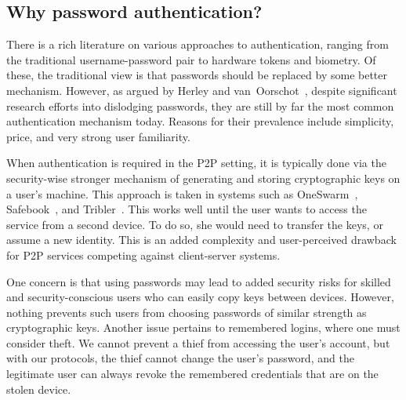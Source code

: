 
\subsection{Why password authentication?}

There is a rich literature on various approaches to authentication, ranging
from the traditional username-password pair to hardware tokens and
biometry. Of these, the traditional view is that passwords should be replaced
by some better mechanism. However, as argued by Herley and
van~Oorschot~\cite{HerleyO12}, despite significant research efforts into
dislodging passwords, they are still by far the most common authentication
mechanism today. Reasons for their prevalence include simplicity, price, and
very strong user familiarity.

When authentication is required in the P2P setting, it is typically done
via the security-wise stronger mechanism of generating and storing
cryptographic keys on a user's machine. This approach is taken in systems such
as OneSwarm~\cite{IsdalPKA10}, Safebook~\cite{Cutillo09a}, and
Tribler~\cite{AbbasPES09}.  This works well until the user wants to access the service from a second
device. To do so, she would need to transfer the keys, or assume a new
identity. This is an added complexity and user-perceived drawback for P2P
services competing against client-server systems.

One concern is that using passwords may lead to added security risks
for skilled and security-conscious users who can easily copy keys
between devices.  However, nothing prevents such users from choosing
passwords of similar strength as cryptographic keys. Another issue
pertains to remembered logins, where one must consider theft. We
cannot prevent a thief from accessing the user's account, but with our
protocols, the thief cannot change the user's password, and the
legitimate user can always revoke the remembered credentials that are
on the stolen device.

